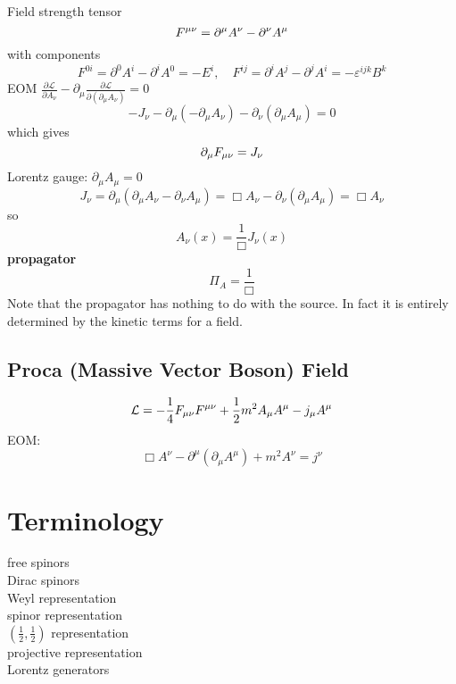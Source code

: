 Field strength tensor 
\[ F^{\mu\nu} = \partial^{\mu}A^{\nu} - \partial^{\nu}A^{\mu} \] 
with components 
\[ F^{0i} = \partial^{0}A^{i} - \partial^{i}A^{0} = -E^{i}, 
\quad
F^{ij} = \partial^{i}A^{j} - \partial^{j}A^{i} = -\varepsilon^{ijk}B^{k} \]
EOM
$\frac{\partial\mathcal{L}}{\partial{A_\nu}}-\partial_\mu\frac{\partial\mathcal{L}}{\partial(\partial_{\mu}A_\nu)}=0$
\[-J_\nu-\partial_\mu(-\partial_{\mu}A_\nu)-\partial_\nu(\partial_{\mu}A_\mu)=0\]
which gives
\[\partial_{\mu}F_{\mu\nu}=J_\nu\]
Lorentz gauge: $\partial_{\mu}A_{\mu}=0$
\[J_{\nu}=\partial_{\mu}(\partial_{\mu}A_\nu-\partial_{\nu}A_{\mu})=\Box{A_\nu}-\partial_{\nu}(\partial_{\mu}A_{\mu})
=\Box{A_{\nu}}\]
so
\[A_{\nu}(x)=\frac{1}{\Box}J_{\nu}(x)\]
\textbf{propagator}
\[\Pi_A=\frac{1}{\Box}\]
Note that the propagator has nothing to do with the source. In fact it is
entirely determined by the kinetic terms for a field.

\subsection{Proca (Massive Vector Boson) Field}
$$ \mathcal{L} = -\frac{1}{4}F_{\mu\nu}F^{\mu\nu} +
\frac{1}{2}m^{2}A_{\mu}A^{\mu} - j_{\mu}A^{\mu} $$
EOM:
$$ \Box A^{\nu} - \partial^{\mu}(\partial_{\mu}A^{\mu}) + m^{2}A^{\nu} =
j^{\nu}$$

\section{Terminology}
\begin{description}
    \item [free spinors]
    \item [Dirac spinors]
    \item [Weyl representation]
    \item [spinor representation]
    \item [$(\frac{1}{2}, \frac{1}{2})$ representation]
    \item [projective representation]
    \item [Lorentz generators]
\end{description}
